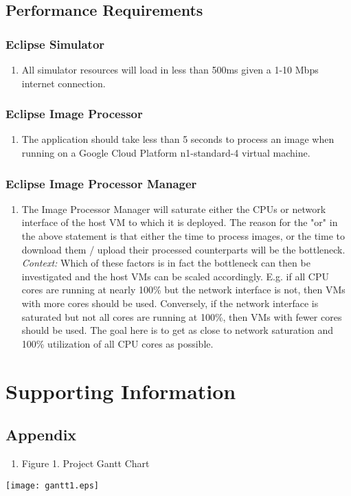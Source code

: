 \documentclass[10pt, onecolumn, draftclsnofoot, letterpaper, compsoc]{IEEEtran}
\begin{document}
\subsection{Performance Requirements}

\subsubsection{Eclipse Simulator}
	\begin{enumerate}
		\item All simulator resources will load in less than 500ms given a 1-10
		 Mbps internet connection.
	\end{enumerate}

\subsubsection{Eclipse Image Processor}
	\begin{enumerate}
		\item The application should take less than 5 seconds to process an
		 image when running on a Google Cloud Platform n1-standard-4 virtual
		 machine.
	\end{enumerate}

\subsubsection{Eclipse Image Processor Manager}
	\begin{enumerate}
		\item The Image Processor Manager will saturate either the CPUs or network interface of
		the host VM to which it is deployed. The reason for the "or" in the above statement is
		that either the time to process images, or the time to download them / upload their
		processed counterparts will be the bottleneck. \textit{Context:} Which of these factors 
		is in fact the bottleneck can then be investigated and the host VMs can be scaled 
		accordingly. E.g. if all CPU cores are running at nearly 100\% but the network interface 
		is not, then VMs with more cores should be used. Conversely, if the network interface is 
		saturated but not all cores are running at 100\%, then VMs with fewer cores should be used. 
		The goal here is to get as close to network saturation and 100\% utilization of all CPU
		cores as possible.
	\end{enumerate}

\newpage
\section{Supporting Information}

\subsection{Appendix}

\begin{enumerate}
	\item Figure 1. Project Gantt Chart 
\end{enumerate}

\begin{center}
	\texttt{[image: gantt1.eps]}
\end{center}
\end{document}
